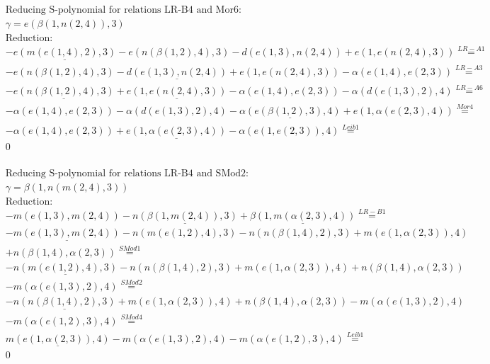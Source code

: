\documentclass[11pt]{amsart}
\begin{document}
\begin{align*} 
& \text{Reducing S-polynomial for relations LR-B4 and Mor6:} \\ 
& \gamma = e(\beta(1,n(2,4)),3) \\ 
& \text{Reduction}: \\& - \underline{e(m(e(1,4),2),3)} - e(n(\beta(1,2),4),3) - d(e(1,3),n(2,4)) + e(1,e(n(2,4),3)) \stackrel{ LR-A1 }{=}  \\ 
& - e(n(\beta(1,2),4),3) - \underline{d(e(1,3),n(2,4))} + e(1,e(n(2,4),3)) - \alpha(e(1,4),e(2,3)) \stackrel{ LR-A3 }{=}  \\ 
& - \underline{e(n(\beta(1,2),4),3)} + \underline{e(1,e(n(2,4),3))} - \alpha(e(1,4),e(2,3)) - \alpha(d(e(1,3),2),4) \stackrel{ LR-A6 }{=}  \\ 
& - \alpha(e(1,4),e(2,3)) - \alpha(d(e(1,3),2),4) - \underline{\alpha(e(\beta(1,2),3),4)} + e(1,\alpha(e(2,3),4)) \stackrel{ Mor4 }{=}  \\ 
& - \alpha(e(1,4),e(2,3)) + \underline{e(1,\alpha(e(2,3),4))} - \alpha(e(1,e(2,3)),4) \stackrel{ Leib1 }{=}  \\ 
&0\\ 
\end{align*} 
 
\begin{align*} 
& \text{Reducing S-polynomial for relations LR-B4 and SMod2:} \\ 
& \gamma = \beta(1,n(m(2,4),3)) \\ 
& \text{Reduction}: \\& - m(e(1,3),m(2,4)) - \underline{n(\beta(1,m(2,4)),3)} + \underline{\beta(1,m(\alpha(2,3),4))} \stackrel{ LR-B1 }{=}  \\ 
& - \underline{m(e(1,3),m(2,4))} - n(m(e(1,2),4),3) - n(n(\beta(1,4),2),3) + m(e(1,\alpha(2,3)),4)\\ 
 &  + n(\beta(1,4),\alpha(2,3)) \stackrel{ SMod1 }{=}  \\ 
& - \underline{n(m(e(1,2),4),3)} - n(n(\beta(1,4),2),3) + m(e(1,\alpha(2,3)),4) + n(\beta(1,4),\alpha(2,3))\\ 
 &  - m(\alpha(e(1,3),2),4) \stackrel{ SMod2 }{=}  \\ 
& - \underline{n(n(\beta(1,4),2),3)} + m(e(1,\alpha(2,3)),4) + n(\beta(1,4),\alpha(2,3)) - m(\alpha(e(1,3),2),4)\\ 
 &  - m(\alpha(e(1,2),3),4) \stackrel{ SMod4 }{=}  \\ 
&\underline{m(e(1,\alpha(2,3)),4)} - m(\alpha(e(1,3),2),4) - m(\alpha(e(1,2),3),4) \stackrel{ Leib1 }{=}  \\ 
&0\\ 
\end{align*} 
 
\end{document}
